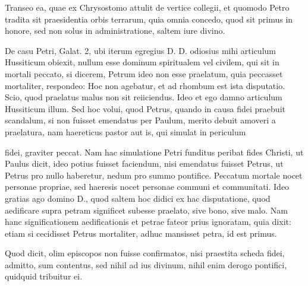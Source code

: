 Transeo ea, quae ex Chrysostomo attulit de vertice collegii, et quomodo Petro tradita sit praesidentia orbis terrarum, quia omnia concedo, quod sit primus in honore, sed non solus in administratione, saltem iure divino.

De casu Petri, Galat. 2, ubi iterum egregius D. D. odiosius mihi articulum Hussiticum obiexit, nullum esse dominum spiritualem vel civilem, qui sit in mortali peccato, si dicerem, Petrum ideo non esse praelatum, quia peccasset mortaliter, respondeo: Hoc non agebatur, et ad rhombum est ista disputatio. Scio, quod praelatus malus non sit reiiciendus. Ideo et ego damno articulum Hussiticum illum. Sed hoc volui, quod Petrus, quando in causa fidei praebuit scandalum, si non fuisset emendatus per Paulum, merito debuit amoveri a praelatura, nam haereticus pastor aut is, qui simulat in periculum

fidei, graviter peccat. Nam hac simulatione Petri funditus peribat fides Christi, ut Paulus dicit, ideo potius fuisset faciendum, nisi emendatus fuisset Petrus, ut Petrus pro nullo haberetur, nedum pro summo pontifice. Peccatum mortale nocet personae propriae, sed haeresis nocet personae communi et communitati. Ideo gratias ago domino D., quod saltem hoc didici ex hac disputatione, quod aedificare supra petram significet subesse praelato, sive bono, sive malo. Nam hanc significationem aedificationis et petrae fateor prius ignoratam, quia dixit: etiam si cecidisset Petrus mortaliter, adhuc mansisset petra, id est primus.

Quod dicit, olim episcopos non fuisse confirmatos, nisi praestita scheda fidei, admitto, sum contentus, sed nihil ad ius divinum, nihil enim derogo pontifici, quidquid tribuitur ei.

